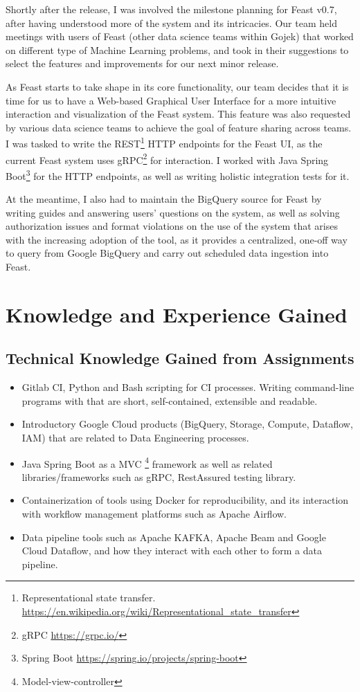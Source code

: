 \documentclass[a4paper, 12pt, fleqn]{report}
\begin{document}
Shortly after the release, I was involved the milestone planning for Feast v0.7,
after having understood more of the system and its intricacies. Our team held
meetings with users of Feast (other data science teams within Gojek) that worked
on different type of Machine Learning problems, and took in their suggestions to
select the features and improvements for our next minor release. \newline

As Feast starts to take shape in its core functionality, our team decides that
it is time for us to have a Web-based Graphical User Interface for a more
intuitive interaction and visualization of the Feast system. This feature was
also requested by various data science teams to achieve the goal of feature
sharing across teams. I was tasked to write the REST\footnote{Representational
  state transfer.
  \url{https://en.wikipedia.org/wiki/Representational_state_transfer}} HTTP
endpoints for the Feast UI, as the current Feast system uses gRPC\footnote{gRPC
  \url{https://grpc.io/}} for interaction. I worked with Java Spring
Boot\footnote{Spring Boot \url{https://spring.io/projects/spring-boot}} for the
HTTP endpoints, as well as writing holistic integration tests for it. \newline

At the meantime, I also had to maintain the BigQuery source for Feast by writing
guides and answering users' questions on the system, as well as solving
authorization issues and format violations on the use of the system that arises
with the increasing adoption of the tool, as it provides a centralized, one-off
way to query from Google BigQuery and carry out scheduled data ingestion into
Feast.

\chapter{Knowledge and Experience Gained}

\section{Technical Knowledge Gained from Assignments}
\begin{itemize}
  \item Gitlab CI, Python and Bash scripting for CI processes. Writing
    command-line programs with that are short, self-contained, extensible and
    readable.
  \item Introductory Google Cloud products (BigQuery, Storage, Compute,
    Dataflow, IAM) that are related to Data Engineering processes.
  \item Java Spring Boot as a MVC \footnote{Model-view-controller} framework as
    well as related libraries/frameworks such as gRPC, RestAssured testing
    library.
  \item Containerization of tools using Docker for reproducibility, and its
    interaction with workflow management platforms such as Apache Airflow.
  \item Data pipeline tools such as Apache KAFKA, Apache Beam and Google Cloud
    Dataflow, and how they interact with each other to form a data pipeline.
\end{itemize}
\end{document}
